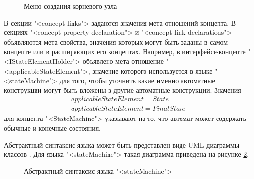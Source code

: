 \begin{itemize}
\begin{figure}
 \centering
 \caption{Меню создания корневого узла}
 \label{fig:CreateStateMachine}
\end{figure}

В секции "<concept links"> задаются значения мета-отношений концепта. В секциях "<concept property declaration"> и "<concept link declarations"> объявляются мета-свойства, значения которых могут быть заданы в самом концепте или в расширяющих его концептах. Например, в интерфейсе-концепте "<IStateElementHolder"> объявлено мета-отношение "<applic\-able\-Sta\-te\-Ele\-ment">, значение которого используется в языке "<stateMachine"> для того, чтобы уточнить какие именно автоматные конструкции могут быть вложены в другие автоматные конструкции. Значения
$$
\begin{array}{l}
applicableStateElement = State\\
applicableStateElement = FinalState
\end{array}
$$
для концепта "<StateMachine"> указывают на то, что автомат может содержать обычные и конечные состояния.
\end{itemize}

Абстрактный синтаксис языка может быть представлен виде UML-диаграммы классов \cite{uml}. Для языка "<stateMachine"> такая диаграмма приведена на рисунке \ref{fig:AbstractSyntax}.

\begin{figure}
 \centering
 \caption{Абстрактный синтаксис языка "<stateMachine">}
 \label{fig:AbstractSyntax}
\end{figure}
